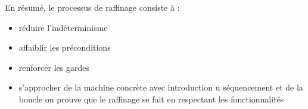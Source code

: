 \documentclass[11pt,a4paper,xcolor=table]{beamer} %
\begin{document}
\begin{frame}
En résumé, le processus de raffinage consiste à :
\begin{itemize}
\item réduire l'indéterminisme
\item affaiblir les préconditions
\item renforcer les gardes
\item s'approcher de la machine concrète avec introduction u séquencement et de la boucle
on prouve que le raffinage se fait en respectant les fonctionnalités
\end{itemize}
\end{frame}
\fi

\end{document}
